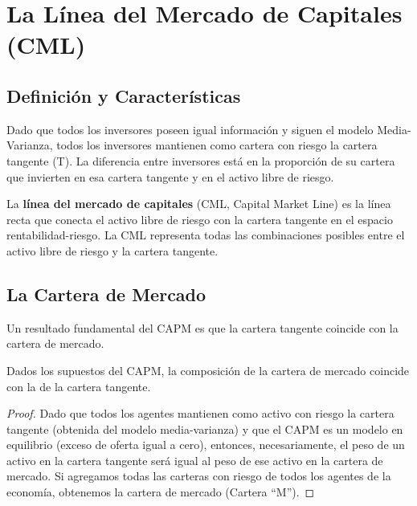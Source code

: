 \section{La Línea del Mercado de Capitales (CML)}

\subsection{Definición y Características}

Dado que todos los inversores poseen igual información y siguen el modelo Media-Varianza, todos los inversores mantienen como cartera con riesgo la cartera tangente (T). La diferencia entre inversores está en la proporción de su cartera que invierten en esa cartera tangente y en el activo libre de riesgo.

\begin{definicion}
La \textbf{línea del mercado de capitales} (CML, Capital Market Line) es la línea recta que conecta el activo libre de riesgo con la cartera tangente en el espacio rentabilidad-riesgo. La CML representa todas las combinaciones posibles entre el activo libre de riesgo y la cartera tangente.
\end{definicion}

\subsection{La Cartera de Mercado}

Un resultado fundamental del CAPM es que la cartera tangente coincide con la cartera de mercado.

\begin{proposicion}
Dados los supuestos del CAPM, la composición de la cartera de mercado coincide con la de la cartera tangente.
\end{proposicion}

\begin{proof}
Dado que todos los agentes mantienen como activo con riesgo la cartera tangente (obtenida del modelo media-varianza) y que el CAPM es un modelo en equilibrio (exceso de oferta igual a cero), entonces, necesariamente, el peso de un activo en la cartera tangente será igual al peso de ese activo en la cartera de mercado. Si agregamos todas las carteras con riesgo de todos los agentes de la economía, obtenemos la cartera de mercado (Cartera ``M'').
\end{proof}


